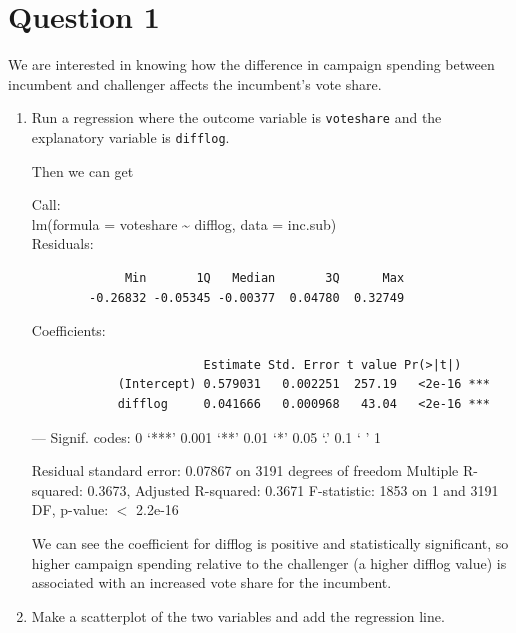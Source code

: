 \documentclass[12pt,letterpaper]{article}
\begin{document}
\section*{Question 1}
\vspace{.25cm}
\noindent We are interested in knowing how the difference in campaign spending between incumbent and challenger affects the incumbent's vote share. 
	\begin{enumerate}
		\item Run a regression where the outcome variable is \texttt{voteshare} and the explanatory variable is \texttt{difflog}.	
		
		 
		
		Then we can get
		
		Call:\\
		lm(formula = voteshare \~{} difflog, data = inc.sub)\\
		
		Residuals:\\
			\begin{verbatim}
		     Min       1Q   Median       3Q      Max 
		-0.26832 -0.05345 -0.00377  0.04780  0.32749 
		\end{verbatim}
		
		Coefficients:\\
		\begin{verbatim}
			            Estimate Std. Error t value Pr(>|t|)    
			(Intercept) 0.579031   0.002251  257.19   <2e-16 ***
			difflog     0.041666   0.000968   43.04   <2e-16 ***
		\end{verbatim}
		
		---
		Signif. codes:  0 ‘***’ 0.001 ‘**’ 0.01 ‘*’ 0.05 ‘.’ 0.1 ‘ ’ 1
		
		Residual standard error: 0.07867 on 3191 degrees of freedom
		Multiple R-squared:  0.3673,	Adjusted R-squared:  0.3671 
		F-statistic:  1853 on 1 and 3191 DF,  p-value: $<$ 2.2e-16
		
		We can see the coefficient for difflog is positive and statistically significant, so higher campaign spending relative to the challenger (a higher difflog value) is associated with an increased vote share for the incumbent.
		
\vspace{5cm}
		\item Make a scatterplot of the two variables and add the regression line. 	
		
			 
			

\end{enumerate}
\end{document}
